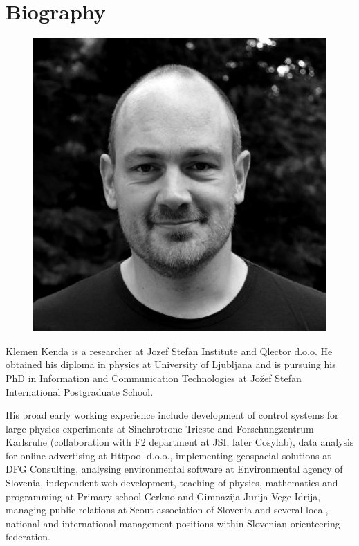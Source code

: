 % 
\chapter{Biography}

\begin{figure}
    \vspace{-0.5cm}
    \includegraphics[width=1\linewidth]{figures/klemen_kenda_qlector.jpg} 
    \label{fig:portrait}
\end{figure}

Klemen Kenda is a researcher at Jozef Stefan Institute and Qlector d.o.o.
He obtained his diploma in physics at University of Ljubljana and is pursuing his PhD in Information and Communication Technologies at Jožef Stefan International Postgraduate School. 

His broad early working experience include development of control systems for large physics experiments at Sinchrotrone Trieste and Forschungzentrum Karlsruhe (collaboration with F2 department at JSI, later Cosylab), data analysis for online advertising at Httpool d.o.o., implementing geospacial solutions at DFG Consulting, analysing environmental software at Environmental agency of Slovenia, independent web development, teaching of physics, mathematics and programming at Primary school Cerkno and Gimnazija Jurija Vege Idrija, managing public relations at Scout association of Slovenia and several local, national and international management positions within Slovenian orienteering federation.

